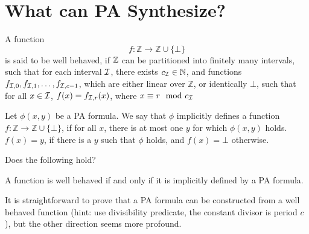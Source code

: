 \documentclass{article}
\begin{document}
\section{What can PA Synthesize?}
\begin{definition}
A function $$f: \mathbb{Z} \rightarrow \mathbb{Z} \cup \{\bot\}$$ is said to be well behaved, if $\mathbb{Z}$ can be partitioned into finitely many intervals, such that for each interval $\mathcal{I}$, there exists $c_{\mathcal{I}} \in \mathbb{N}$, and functions $f_{\mathcal{I},0}, f_{\mathcal{I},1}, \dots, f_{\mathcal{I},c-1}$, which are either linear over $\mathbb{Z}$, or identically $\bot$, such that for all $x \in \mathcal{I}$, $f(x) = f_{\mathcal{I},r}(x)$, where $x \equiv r \mod c_{\mathcal{I}}$
\end{definition}

\begin{definition}
Let $\phi(x, y)$ be a PA formula. We say that $\phi$ implicitly defines a function $f: \mathbb{Z} \rightarrow \mathbb{Z} \cup \{\bot\}$, if for all $x$, there is at most one $y$ for which $\phi(x, y)$ holds. $f(x) = y$, if there is a $y$ such that $\phi$ holds, and $f(x) = \bot$ otherwise.
\end{definition}

\begin{question}
Does the following hold?

A function is well behaved if and only if it is implicitly defined by a PA formula.
\end{question}

It is straightforward to prove that a PA formula can be constructed from a well behaved function (hint: use divisibility predicate, the constant divisor is period $c$), but the other direction seems more profound.
\end{document}
